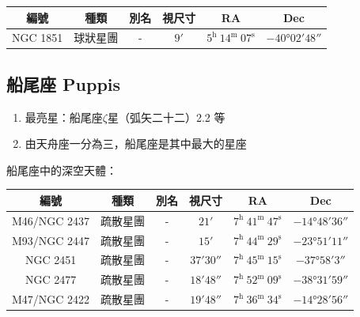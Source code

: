 \begin{center}
\begin{longtable}{c | c | c | c | c | c}
    編號 & 種類 & 別名 & 視尺寸 & RA & Dec \\
    \hline
    \endfirsthead


    \endfoot

    \endlastfoot

    NGC 1851 & 球狀星團 & - & \(\ang{;9;}\) & \(5^\text{h }14^\text{m }07^\text{s}\) & \(-\ang{40;02;48}\) \\
\end{longtable}
\end{center}

\subsection{船尾座 Puppis}
\begin{enumerate}
    \item 最亮星：船尾座\(\zeta\)星（弧矢二十二）2.2 等
    \item 由天舟座一分為三，船尾座是其中最大的星座
\end{enumerate}
船尾座中的深空天體：

\begin{center}
\begin{longtable}{c | c | c | c | c | c}
    編號 & 種類 & 別名 & 視尺寸 & RA & Dec \\
    \hline
    \endfirsthead


    \endfoot

    \endlastfoot

    M46/NGC 2437 & 疏散星團 & - & \(\ang{;21;}\) & \(7^\text{h }41^\text{m }47^\text{s}\) & \(-\ang{14;48;36}\) \\
    M93/NGC 2447 & 疏散星團 & - & \(\ang{;15;}\) & \(7^\text{h }44^\text{m }29^\text{s}\) & \(-\ang{23;51;11}\) \\
    NGC 2451 & 疏散星團 & - &  \(\ang{;37;30}\) & \(7^\text{h }45^\text{m }15^\text{s}\) & \(-\ang{37;58;3}\) \\
    NGC 2477 & 疏散星團 & - & \(\ang{;18;48}\) & \(7^\text{h }52^\text{m }09^\text{s}\) & \(-\ang{38;31;59}\) \\
    M47/NGC 2422 & 疏散星團 & - & \(\ang{;19;48}\) & \(7^\text{h }36^\text{m }34^\text{s}\) & \(-\ang{14;28;56}\) \\
\end{longtable}
\end{center}

